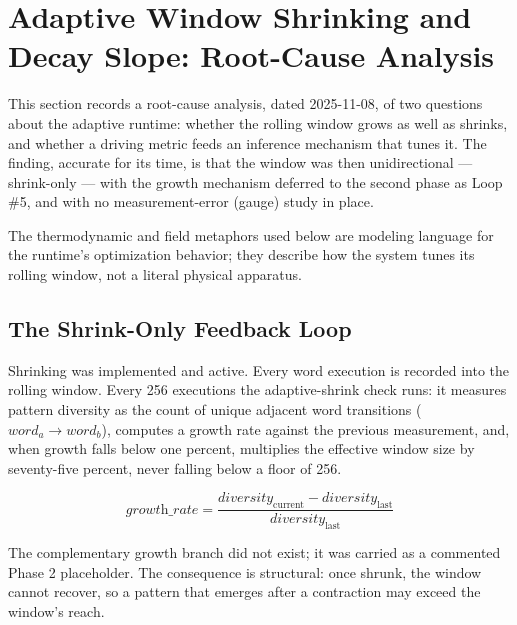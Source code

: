 
\section{Adaptive Window Shrinking and Decay Slope: Root-Cause Analysis}

This section records a root-cause analysis, dated 2025-11-08, of two questions
about the adaptive runtime: whether the rolling window grows as well as shrinks,
and whether a driving metric feeds an inference mechanism that tunes it. The
finding, accurate for its time, is that the window was then unidirectional ---
shrink-only --- with the growth mechanism deferred to the second phase as Loop
\#5, and with no measurement-error (gauge) study in place.

The thermodynamic and field metaphors used below are modeling language for the
runtime's optimization behavior; they describe how the system tunes its rolling
window, not a literal physical apparatus.

\subsection{The Shrink-Only Feedback Loop}

Shrinking was implemented and active. Every word execution is recorded into the
rolling window. Every 256 executions the adaptive-shrink check runs: it measures
pattern diversity as the count of unique adjacent word transitions
($\textit{word}_a \rightarrow \textit{word}_b$), computes a growth rate against
the previous measurement, and, when growth falls below one percent, multiplies
the effective window size by seventy-five percent, never falling below a floor of
256.

\begin{equation}
\textit{growth\_rate} =
  \frac{\textit{diversity}_{\text{current}} - \textit{diversity}_{\text{last}}}
       {\textit{diversity}_{\text{last}}}
\end{equation}

The complementary growth branch did not exist; it was carried as a commented
Phase 2 placeholder. The consequence is structural: once shrunk, the window
cannot recover, so a pattern that emerges after a contraction may exceed the
window's reach.

